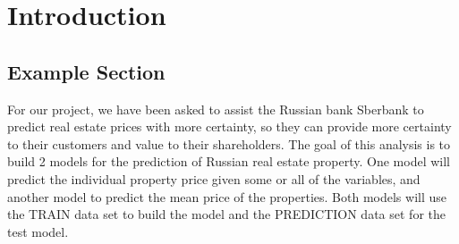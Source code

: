 \chapter{Introduction}\label{chap:introduction}

\section{Example Section}

\begin{center}
    For our project, we have been asked to assist the Russian bank Sberbank to predict real estate
     prices with more certainty, 
    so they can provide more certainty to their customers and value to their shareholders.  
    The goal of this analysis is to build 2 models for the prediction of Russian real estate property. One model will 
    predict the individual property price given some or all of the variables, and another model to predict the mean
     price of the properties. Both models will use the TRAIN data set to build the model and the PREDICTION 
     data set for the test model.
    \end{center}